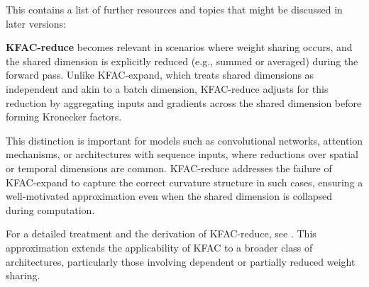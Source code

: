 This contains a list of further resources and topics that might be discussed in later versions:

\par{\textbf{KFAC-reduce}} becomes relevant in scenarios where weight sharing occurs, and the shared dimension is explicitly reduced (e.g., summed or averaged) during the forward pass. Unlike KFAC-expand, which treats shared dimensions as independent and akin to a batch dimension, KFAC-reduce adjusts for this reduction by aggregating inputs and gradients across the shared dimension before forming Kronecker factors.

This distinction is important for models such as convolutional networks, attention mechanisms, or architectures with sequence inputs, where reductions over spatial or temporal dimensions are common. KFAC-reduce addresses the failure of KFAC-expand to capture the correct curvature structure in such cases, ensuring a well-motivated approximation even when the shared dimension is collapsed during computation.

For a detailed treatment and the derivation of KFAC-reduce, see \citet{eschenhagen2023kroneckerfactored}. This approximation extends the applicability of KFAC to a broader class of architectures, particularly those involving dependent or partially reduced weight sharing.